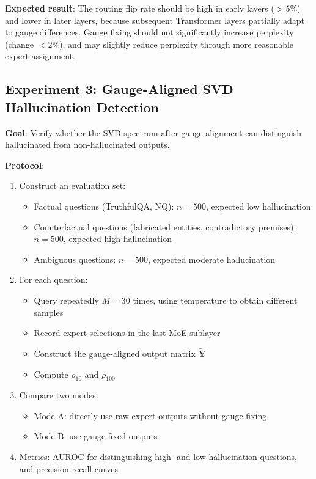 \documentclass[12pt,a4paper]{article}
\theoremstyle{remark}
\begin{document}
\textbf{Expected result}: The routing flip rate should be high in early layers ($>5\%$) and lower in later layers, because subsequent Transformer layers partially adapt to gauge differences. Gauge fixing should not significantly increase perplexity (change $< 2\%$), and may slightly reduce perplexity through more reasonable expert assignment.

\subsection{Experiment 3: Gauge-Aligned SVD Hallucination Detection}

\textbf{Goal}: Verify whether the SVD spectrum after gauge alignment can distinguish hallucinated from non-hallucinated outputs.

\textbf{Protocol}:
\begin{enumerate}
    \item Construct an evaluation set:
        \begin{itemize}
            \item Factual questions (TruthfulQA, NQ): $n=500$, expected low hallucination
            \item Counterfactual questions (fabricated entities, contradictory premises): $n=500$, expected high hallucination
            \item Ambiguous questions: $n=500$, expected moderate hallucination
        \end{itemize}
    \item For each question:
        \begin{itemize}
            \item Query repeatedly $M=30$ times, using temperature to obtain different samples
            \item Record expert selections in the last MoE sublayer
            \item Construct the gauge-aligned output matrix $\tilde{\mathbf{Y}}$
            \item Compute $\rho_{10}$ and $\rho_{100}$
        \end{itemize}
    \item Compare two modes:
        \begin{itemize}
            \item Mode A: directly use raw expert outputs without gauge fixing
            \item Mode B: use gauge-fixed outputs
        \end{itemize}
    \item Metrics: AUROC for distinguishing high- and low-hallucination questions, and precision-recall curves
\end{enumerate}
\end{document}
